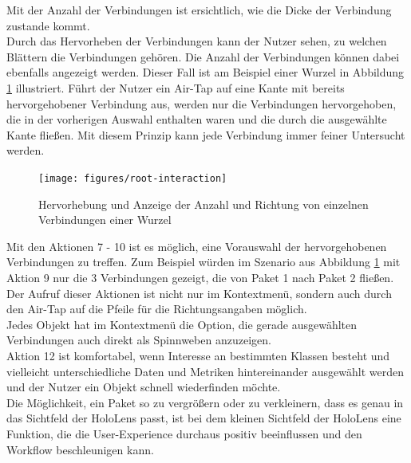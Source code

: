 \noindent Mit der Anzahl der Verbindungen ist ersichtlich, wie die Dicke der Verbindung zustande kommt.\\

\noindent Durch das Hervorheben der Verbindungen kann der Nutzer sehen, zu welchen Blättern die Verbindungen gehören. Die Anzahl der Verbindungen können dabei ebenfalls angezeigt werden. Dieser Fall ist am Beispiel einer Wurzel in Abbildung \ref{fig:root-interaction} illustriert. Führt der Nutzer ein Air-Tap auf eine Kante mit bereits hervorgehobener Verbindung aus, werden nur die Verbindungen hervorgehoben, die in der vorherigen Auswahl enthalten waren und die durch die ausgewählte Kante fließen. Mit diesem Prinzip kann jede Verbindung immer feiner Untersucht werden.\\

\begin{figure}[htb]
  \texttt{[image: figures/root-interaction]}
  \caption{Hervorhebung und Anzeige der Anzahl und Richtung von einzelnen Verbindungen einer Wurzel}
  \label{fig:root-interaction}
\end{figure}

\noindent Mit den Aktionen 7 - 10 ist es möglich, eine Vorauswahl der hervorgehobenen Verbindungen zu treffen. Zum Beispiel würden im Szenario aus Abbildung \ref{fig:root-interaction} mit Aktion 9 nur die 3 Verbindungen gezeigt, die von Paket 1 nach Paket 2 fließen. Der Aufruf dieser Aktionen ist nicht nur im Kontextmenü, sondern auch durch den Air-Tap auf die Pfeile für die Richtungsangaben möglich. \\

\noindent Jedes Objekt hat im Kontextmenü die Option, die gerade ausgewählten Verbindungen auch direkt als Spinnweben anzuzeigen.\\

\noindent Aktion 12 ist komfortabel, wenn Interesse an bestimmten Klassen besteht und vielleicht unterschiedliche Daten und Metriken hintereinander ausgewählt werden und der Nutzer ein Objekt schnell wiederfinden möchte.\\

\noindent Die Möglichkeit, ein Paket so zu vergrößern oder zu verkleinern, dass es genau in das Sichtfeld der HoloLens passt, ist bei dem kleinen Sichtfeld der HoloLens eine Funktion, die die User-Experience durchaus positiv beeinflussen und den Workflow beschleunigen kann.\\

